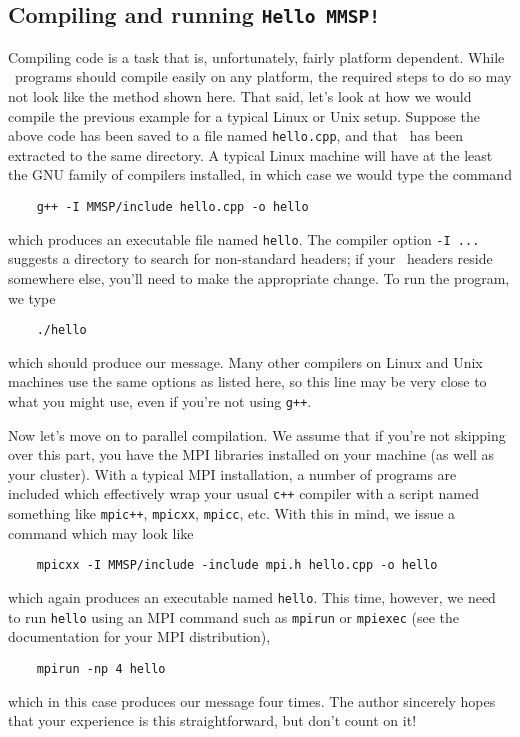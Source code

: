 \subsection{Compiling and running {\tt Hello MMSP!}}
Compiling code is a task that is, unfortunately, fairly platform dependent.  While \MMSP\ programs should compile easily on any platform, the required steps to do so may not look like the method shown here.  That said, let's look at how we would compile the previous example for a typical Linux or Unix setup.  Suppose the above code has been saved to a file named {\tt hello.cpp}, and that \MMSP\ has been extracted to the same directory.  A typical Linux machine will have at the least the GNU family of compilers installed, in which case we would type the command 
\begin{shadebox}
\begin{verbatim}
    g++ -I MMSP/include hello.cpp -o hello
\end{verbatim}
\end{shadebox}
which produces an executable file named {\tt hello}.  The compiler option {\tt -I ...} suggests a directory to search for non-standard headers; if your \MMSP\ headers reside somewhere else, you'll need to make the appropriate change.  To run the program, we type
\begin{shadebox}
\begin{verbatim}
    ./hello
\end{verbatim}
\end{shadebox}
which should produce our message.  Many other compilers on Linux and Unix machines use the same options as listed here, so this line may be very close to what you might use, even if you're not using {\tt g++}.

Now let's move on to parallel compilation.  We assume that if you're not skipping over this part, you have the MPI libraries installed on your machine (as well as your cluster).  With a typical MPI installation, a number of programs are included which effectively wrap your usual {\tt c++} compiler with a script named something like {\tt mpic++}, {\tt mpicxx}, {\tt mpicc}, etc.  With this in mind, we issue a command which may look like
\begin{shadebox}
\begin{verbatim}
    mpicxx -I MMSP/include -include mpi.h hello.cpp -o hello
\end{verbatim}
\end{shadebox}
which again produces an executable named {\tt hello}.  This time, however, we need to run {\tt hello} using an MPI command such as {\tt mpirun} or {\tt mpiexec} (see the documentation for your MPI distribution),
\begin{shadebox}
\begin{verbatim}
    mpirun -np 4 hello
\end{verbatim}
\end{shadebox}
which in this case produces our message four times.  The author sincerely hopes that your experience is this straightforward, but don't count on it!

